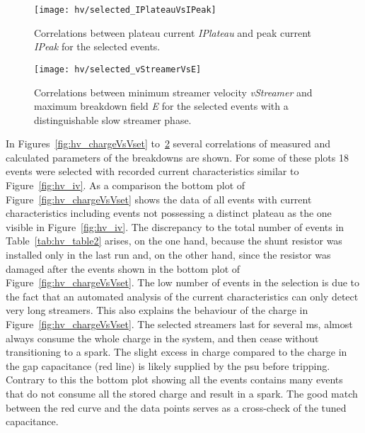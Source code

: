 \begin{figure}[p]
	\centering
	\texttt{[image: hv/selected\_IPlateauVsIPeak]}
	\caption[ test plateau current versus peak current]{%
		Correlations between plateau current \emph{IPlateau} and peak current \emph{IPeak} for the selected events.
		}
	\label{fig:hv_IPlateauVsIPeak}
\end{figure}

\begin{figure}[p]
	\centering
	\texttt{[image: hv/selected\_vStreamerVsE]}
	\caption[ test minimum streamer velocity versus maximum breakdown field]{%
		Correlations between minimum streamer velocity \emph{vStreamer} and maximum breakdown field \emph{E} for the selected events with a distinguishable slow streamer phase.
	}
	\label{fig:hv_vStreamerVsE}
\end{figure}

In Figures~\ref{fig:hv_chargeVsVset} to~\ref{fig:hv_vStreamerVsE} several correlations of measured and calculated parameters of the breakdowns are shown.
For some of these plots \num{18} events were selected with recorded current characteristics similar to Figure~\ref{fig:hv_iv}.
As a comparison the bottom plot of Figure~\ref{fig:hv_chargeVsVset} shows the data of all events with current characteristics including events not possessing a distinct plateau as the one visible in Figure~\ref{fig:hv_iv}.
The discrepancy to the total number of events in Table~\ref{tab:hv_table2} arises, on the one hand, because the shunt resistor was installed only in the last run and, on the other hand, since the resistor was damaged after the events shown in the bottom plot of Figure~\ref{fig:hv_chargeVsVset}.
The low number of events in the selection is due to the fact that an automated analysis of the current characteristics can only detect very long streamers.
This also explains the behaviour of the charge in Figure~\ref{fig:hv_chargeVsVset}.
The selected streamers last for several \si{\milli\second}, almost always consume the whole charge in the system, and then cease without transitioning to a spark.
The slight excess in charge compared to the charge in the gap capacitance (red line) is likely supplied by the \gls{psu} before tripping.
Contrary to this the bottom plot showing all the events contains many events that do not consume all the stored charge and result in a spark.
The good match between the red curve and the data points serves as a cross-check of the tuned capacitance.

